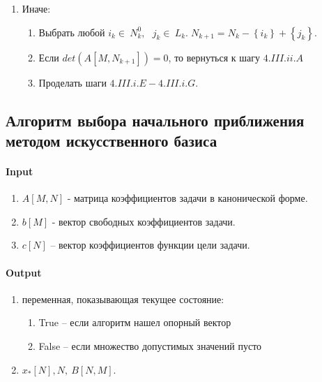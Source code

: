 \documentclass{article}
\begin{document}
\begin{enumerate}
{\begin{enumerate}
{\begin{enumerate}
{\begin{enumerate}
\begin{equation*}
\begin{bmatrix}
                \end{bmatrix}
            \end{equation*}
            \item 	$B_{k+1}\left[N_{k+1},M\right]=F\left[N_{k+1},N_k\right] B_k\left[N_k,M\right]$. Упорядочить $B_{k+1}\left[N_{k+1},M\right]$ по индексам.
            \item 	Выход: $3;\;x_{k+1}\left[N\right],\ N_{k+1},\ B_{k+1}\left[N_{k+1},M\right]$.
        \end{enumerate}}
        \item Иначе: {
        \begin{enumerate}
            \item 	Выбрать любой $i_k\in\ N_k^0,\ \ \ j_k\in\ L_k. \;N_{k+1}=N_k-\left\{i_k\right\}+\left\{j_k\right\}$.
            \item Если $det\left(A\left[M,N_{k+1}\right]\right)=0$, то вернуться к шагу $4.III.ii.A$
            \item Проделать шаги $4.III.i.E-4.III.i.G$.
        \end{enumerate}
        }
    \end{enumerate}
                }
    \end{enumerate}
        }
\end{enumerate}

\subsection {Алгоритм выбора начального приближения методом искусственного базиса}
\paragraph*{Input}
\begin{enumerate}
    \item $A\left[M, N\right]$ - матрица коэффициентов задачи в канонической форме.
    \item $b\left[M\right]$ - вектор свободных коэффициентов задачи.
    \item $c\left[N\right]$ – вектор коэффициентов функции цели задачи.
\end{enumerate}
\paragraph*{Output}
\begin{enumerate}
    \item {переменная, показывающая текущее состояние:
\begin{enumerate}
    \item True – если алгоритм нашел опорный вектор
    \item False – если множество допустимых значений пусто
\end{enumerate}
}
\item $x_{*}[N], N,\ B\left[N,M\right]$.
\end{enumerate}
\end{document}
